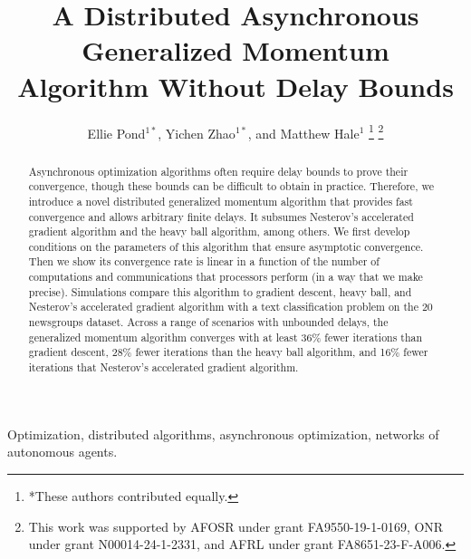 \documentclass[9pt,shortpaper,twoside,web]{ieeecolor}
\newcommand{\blue}[1]{{\textcolor{blue}{#1}}}
\begin{document}
\title{A Distributed Asynchronous Generalized Momentum \\Algorithm Without Delay Bounds}
\author{Ellie Pond$^{1*}$, Yichen Zhao$^{1*}$, and Matthew Hale$^1$
\thanks{*These authors contributed equally.}
\thanks{This work was supported by AFOSR under grant FA9550-19-1-0169, ONR under grant N00014-24-1-2331, and AFRL under grant FA8651-23-F-A006.}}






\maketitle

\begin{abstract}
Asynchronous optimization algorithms often require delay bounds to prove their
convergence, though these bounds can be difficult to obtain in practice.
Therefore, we introduce
a novel distributed generalized momentum algorithm that 
provides fast convergence and 
allows arbitrary finite delays.
It subsumes Nesterov's accelerated gradient
algorithm and the heavy ball algorithm, among others. 
We first develop conditions on the parameters of this algorithm that ensure asymptotic
convergence.
Then we show its convergence rate is linear in a function of the number of computations and communications
that processors perform (in a way that we make precise). 
Simulations compare this algorithm to gradient descent, heavy ball, and Nesterov's accelerated gradient algorithm 
with a text classification problem on the 20 newsgroups dataset. 
Across a range of scenarios with unbounded delays, 
the generalized momentum algorithm converges with at least 36$\%$ fewer iterations than gradient descent, 28$\%$ fewer iterations than the heavy ball algorithm, and 16$\%$ fewer iterations that Nesterov's accelerated gradient algorithm.
\end{abstract}

\begin{IEEEkeywords}
Optimization, distributed algorithms, asynchronous optimization, networks of autonomous agents.
\end{IEEEkeywords}
\end{document}

